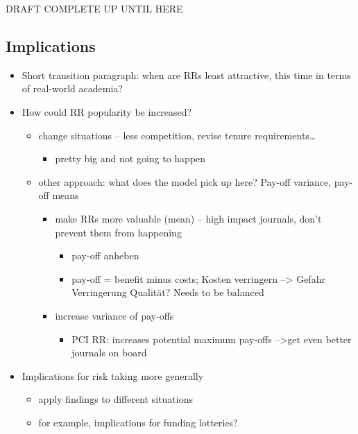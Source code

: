 \documentclass[
  ,man,mask,floatsintext]{apa6}
\providecommand{\tightlist}{%
  \setlength{\itemsep}{0pt}\setlength{\parskip}{0pt}}
\begin{document}
DRAFT COMPLETE UP UNTIL HERE

\hypertarget{implications}{%
\subsection{Implications}\label{implications}}

\begin{itemize}
\tightlist
\item
  Short transition paragraph: when are RRs least attractive, this time in terms of real-world academia?
\item
  How could RR popularity be increased?

  \begin{itemize}
  \tightlist
  \item
    change situations -- less competition, revise tenure requirements\ldots{}

    \begin{itemize}
    \tightlist
    \item
      pretty big and not going to happen
    \end{itemize}
  \item
    other approach: what does the model pick up here? Pay-off variance, pay-off means

    \begin{itemize}
    \tightlist
    \item
      make RRs more valuable (mean) -- high impact journals, don't prevent them from happening

      \begin{itemize}
      \tightlist
      \item
        pay-off anheben
      \item
        pay-off = benefit minus costs; Kosten verringern --\textgreater{} Gefahr Verringerung Qualität? Needs to be balanced
      \end{itemize}
    \item
      increase variance of pay-offs

      \begin{itemize}
      \tightlist
      \item
        PCI RR: increases potential maximum pay-offs --\textgreater get even better journals on board
      \end{itemize}
    \end{itemize}
  \end{itemize}
\item
  Implications for risk taking more generally

  \begin{itemize}
  \tightlist
  \item
    apply findings to different situations
  \item
    for example, implications for funding lotteries?
  \end{itemize}
\end{itemize}
\end{document}
